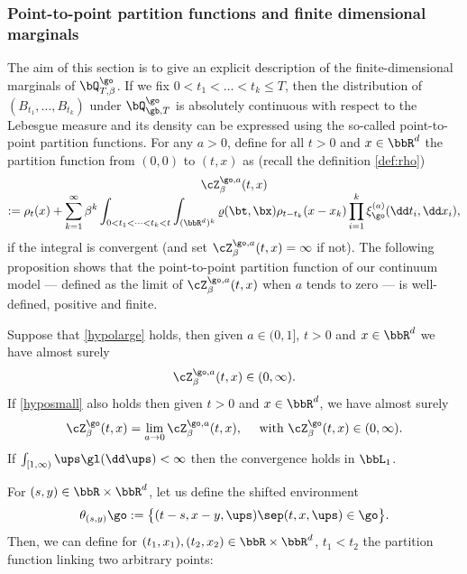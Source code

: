 \subsubsection{Point-to-point partition functions and finite dimensional marginals}\label{ptpmarginals}
The aim of this section is to give an explicit description of the finite-dimensional marginals of $\bQ^{\go}_{T,\beta}$.
If we fix $0<t_1<\dots<t_k\le T$, then the distribution of $(B_{t_1},\dots, B_{t_k})$ under $\bQ_{\gb,T}^{\go}$ is absolutely continuous with respect to the Lebesgue measure and its density can be expressed using the so-called point-to-point partition functions.
For any $a>0$,
define for all $t>0$ and $x\in \bbR^d$
the partition function from $(0,0)$ to $(t,x)$ as (recall the definition \eqref{def:rho})\vspace*{-5pt}
\begin{multline}
\label{def:pointtopoint}
\cZ^{\go,a}_{\beta}(t,x)\\[-5pt]
:= \rho_t(x) + \sum_{k=1}^\infty \beta^k\int_{0<t_1<\dots<t_k<t}\int_{(\bbR^d)^k} \varrho(\bt,\bx) \rho_{t-t_k}(x-x_k)\prod_{i=1}^k \xi_{\go}^{(a)} (\dd t_i, \dd x_i),
\end{multline}
if the integral is convergent (and set $\cZ^{\go,a}_{\beta}(t,x)=\infty$ if not).
The following proposition shows that the
point-to-point partition function of our continuum model --- defined as the limit of $\cZ^{\go,a}_{\beta}(t,x)$ when $a$ tends to zero --- is well-defined, positive and finite.
\begin{proposition}\label{th:superlem}
Suppose that \eqref{hypolarge} holds, then given $a\in (0,1]$, $t>0$ and $x\in \bbR^d$ we have almost surely
\begin{equation}\label{lafinite}
\cZ^{\go,a}_{\beta}(t,x)\in (0,\infty).
\end{equation}
If \eqref{hyposmall} also holds then given $t>0$ and $x\in \bbR^d$, we have almost surely
\begin{equation}\label{lapazero}
\cZ^{\go}_{\beta}(t,x)=\lim_{a\to 0}\cZ^{\go,a}_{\beta}(t,x), \quad \text{ with } \cZ^{\go}_{\beta}(t,x) \in (0,\infty).
\end{equation}
If $\int_{[1,\infty)} \ups \gl(\dd \ups)<\infty$ then the convergence holds in $\bbL_1$.
\end{proposition}
 For $(s,y)\in \bbR\times \bbR^d$, let us define the shifted environment
\[
\theta_{(s,y)}\go := \bigl\{ (t-s,x-y,\ups) \sep (t,x,\ups)\in \go \bigr\}.
\]
Then, we can define for $(t_1,x_1),(t_2,x_2) \in \bbR\times \bbR^d$, $t_1<t_2$ the partition function linking two arbitrary points:

